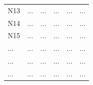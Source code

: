 \documentclass[12pt]{article}
\begin{document}
\begin{enumerate}
\begin{table}[h!]
\begin{tabular}{p{1in}p{1in}p{1in}p{1in}p{1in}p{1in}}
N13 & $\dots$ & $\dots$& $\dots$&$\dots$& $\dots$ \\
N14 & $\dots$ & $\dots$& $\dots$&$\dots$& $\dots$ \\
N15 & $\dots$ & $\dots$& $\dots$&$\dots$& $\dots$ \\
$\dots$ & $\dots$ & $\dots$& $\dots$&$\dots$& $\dots$ \\
$\dots$ & $\dots$ & $\dots$& $\dots$&$\dots$& $\dots$ \\
$\dots$ & $\dots$ & $\dots$& $\dots$&$\dots$& $\dots$ \\

\end{tabular}
\end{table}
\end{enumerate}
\end{document}
